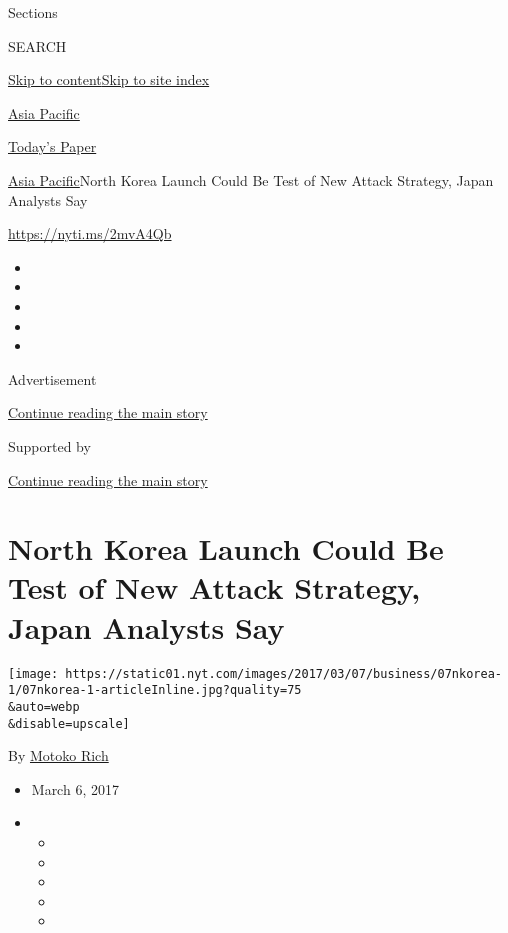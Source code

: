 Sections

SEARCH

\protect\hyperlink{site-content}{Skip to
content}\protect\hyperlink{site-index}{Skip to site index}

\href{https://www.nytimes.com/section/world/asia}{Asia Pacific}

\href{https://myaccount.nytimes.com/auth/login?response_type=cookie\&client_id=vi}{}

\href{https://www.nytimes.com/section/todayspaper}{Today's Paper}

\href{/section/world/asia}{Asia Pacific}\textbar{}North Korea Launch
Could Be Test of New Attack Strategy, Japan Analysts Say

\url{https://nyti.ms/2mvA4Qb}

\begin{itemize}
\item
\item
\item
\item
\item
\end{itemize}

Advertisement

\protect\hyperlink{after-top}{Continue reading the main story}

Supported by

\protect\hyperlink{after-sponsor}{Continue reading the main story}

\hypertarget{north-korea-launch-could-be-test-of-new-attack-strategy-japan-analysts-say}{%
\section{North Korea Launch Could Be Test of New Attack Strategy, Japan
Analysts
Say}\label{north-korea-launch-could-be-test-of-new-attack-strategy-japan-analysts-say}}

\texttt{[image: https://static01.nyt.com/images/2017/03/07/business/07nkorea-1/07nkorea-1-articleInline.jpg?quality=75\\\&auto=webp\\\&disable=upscale]}

By \href{http://www.nytimes.com/by/motoko-rich}{Motoko Rich}

\begin{itemize}
\item
  March 6, 2017
\item
  \begin{itemize}
  \item
  \item
  \item
  \item
  \item
  \end{itemize}
\end{itemize}

